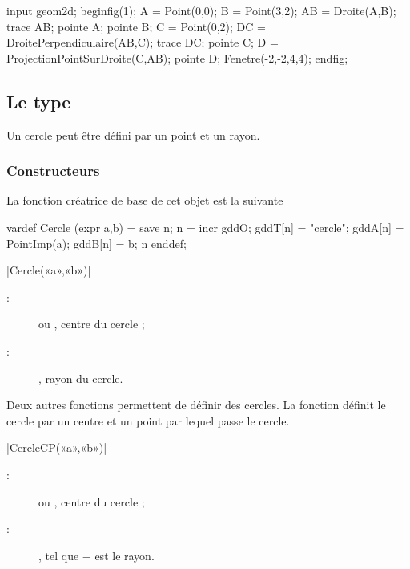 \documentclass[a4paper,french]{article}
\begin{document}
\begin{ExempleMP}
input geom2d;
beginfig(1);
A = Point(0,0);
B = Point(3,2);
AB = Droite(A,B);
trace AB;
pointe A;
pointe B;
C = Point(0,2);
DC = DroitePerpendiculaire(AB,C);
trace DC;
pointe C;
D = ProjectionPointSurDroite(C,AB);
pointe D;
Fenetre(-2,-2,4,4);
endfig;
\end{ExempleMP}





\subsection{Le type }
Un cercle peut être défini par un point et un
rayon.

\subsubsection{Constructeurs}
La fonction créatrice de base de cet objet est la suivante
\begin{mpcode}
vardef Cercle (expr a,b) =
    save n; n = incr gddO;
    gddT[n] = "cercle"; gddA[n] = PointImp(a); gddB[n] = b; n
enddef;
\end{mpcode}
\begin{colourband}
\macro|Cercle(«a»,«b»)|
\begin{description}
  \item[:]   ou ,
  centre du cercle ;
  \item[:] , rayon du cercle.
\end{description}
\end{colourband}
\bigskip


Deux autres fonctions permettent de définir des cercles. La fonction
 définit le cercle par un centre et un point par lequel passe
le cercle.
\begin{colourband}
\macro|CercleCP(«a»,«b»)|
\begin{description}
  \item[:]   ou ,
  centre du cercle ;
  \item[:]  ,
  tel que $-$ est le rayon.
\end{description}
\end{colourband}
\bigskip
\end{document}
